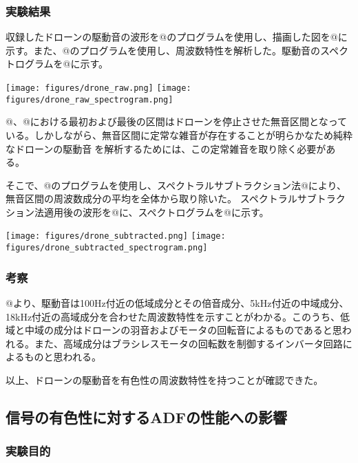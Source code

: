 \hypertarget{ux5b9fux9a13ux7d50ux679c}{%
\subsubsection{実験結果}\label{ux5b9fux9a13ux7d50ux679c}}

収録したドローンの駆動音の波形を@のプログラムを使用し、描画した図を@に示す。また、@のプログラムを使用し、周波数特性を解析した。駆動音のスペクトログラムを@に示す。

\texttt{[image: figures/drone\_raw.png]}
\texttt{[image: figures/drone\_raw\_spectrogram.png]}

@、@における最初および最後の区間はドローンを停止させた無音区間となっている。しかしながら、無音区間に定常な雑音が存在することが明らかなため純粋なドローンの駆動音を解析するためには、この定常雑音を取り除く必要がある。

そこで、@のプログラムを使用し、スペクトラルサブトラクション法@により、無音区間の周波数成分の平均を全体から取り除いた。
スペクトラルサブトラクション法適用後の波形を@に、スペクトログラムを@に示す。

\texttt{[image: figures/drone\_subtracted.png]}
\texttt{[image: figures/drone\_subtracted\_spectrogram.png]}

\hypertarget{ux8003ux5bdf}{%
\subsubsection{考察}\label{ux8003ux5bdf}}

@より、駆動音は100Hz付近の低域成分とその倍音成分、5kHz付近の中域成分、18kHz付近の高域成分を合わせた周波数特性を示すことがわかる。このうち、低域と中域の成分はドローンの羽音およびモータの回転音によるものであると思われる。また、高域成分はブラシレスモータの回転数を制御するインバータ回路によるものと思われる。

以上、ドローンの駆動音を有色性の周波数特性を持つことが確認できた。

\hypertarget{ux4fe1ux53f7ux306eux6709ux8272ux6027ux306bux5bfeux3059ux308badfux306eux6027ux80fdux3078ux306eux5f71ux97ff}{%
\subsection{信号の有色性に対するADFの性能への影響}\label{ux4fe1ux53f7ux306eux6709ux8272ux6027ux306bux5bfeux3059ux308badfux306eux6027ux80fdux3078ux306eux5f71ux97ff}}

\hypertarget{ux5b9fux9a13ux76eeux7684-1}{%
\subsubsection{実験目的}\label{ux5b9fux9a13ux76eeux7684-1}}

